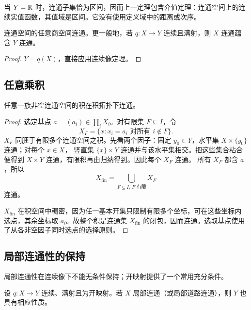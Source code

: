 当 \(Y=\mathbb{R}\) 时，连通子集恰为区间，因而上一定理包含介值定理：连通空间上的连续实值函数，其值域是区间。它没有使用定义域中的距离或次序。

\begin{corollary}[商映射与连通性]
\label{cor:quotient-connected}
连通空间的任意商空间连通。更一般地，若 \(q:X\to Y\) 连续且满射，则 \(X\) 连通蕴含 \(Y\) 连通。
\end{corollary}

\begin{proof}
\(Y=q(X)\)，直接应用连续像定理。
\end{proof}

\subsection{任意乘积}

\begin{theorem}[乘积连通性]
\label{thm:product-connected}
任意一族非空连通空间的积在积拓扑下连通。
\end{theorem}

\begin{proof}
选定基点 \(a=(a_i)\in\prod_iX_i\)。对有限集 \(F\subseteq I\)，令
\[
 X_F=\{x:x_i=a_i\text{ 对所有 }i\notin F\}.
\]
\(X_F\) 同胚于有限多个连通空间之积。先看两个因子：固定
\(y_0\in Y\)，水平集 \(X\times\{y_0\}\) 连通；对每个 \(x\in X\)，
竖直集 \(\{x\}\times Y\) 连通并与该水平集相交。把这些集合粘合便得到
\(X\times Y\) 连通，有限积再由归纳得到。因此每个 \(X_F\) 连通。
所有 \(X_F\) 都含 \(a\)，所以
\[
 X_{\mathrm{fin}}=\bigcup_{F\subseteq I,\ F\text{ 有限}}X_F
\]
连通。

\(X_{\mathrm{fin}}\) 在积空间中稠密，因为任一基本开集只限制有限多个坐标，可在这些坐标内选点，其余坐标取 \(a_i\)。故整个积是连通集 \(X_{\mathrm{fin}}\) 的闭包，因而连通。选取基点使用了从各非空因子同时选点的选择原则。
\end{proof}

\subsection{局部连通性的保持}

局部连通性在连续像下不能无条件保持；开映射提供了一个常用充分条件。

\begin{proposition}[开映射保持局部连通]
\label{prop:open-map-local-connectedness}
设 \(q:X\to Y\) 连续、满射且为开映射。若 \(X\) 局部连通（或局部道路连通），则 \(Y\) 也具有相应性质。
\end{proposition}

